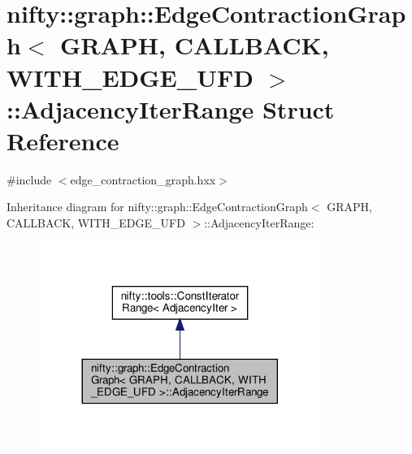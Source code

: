 \hypertarget{structnifty_1_1graph_1_1EdgeContractionGraph_1_1AdjacencyIterRange}{}\section{nifty\+:\+:graph\+:\+:Edge\+Contraction\+Graph$<$ G\+R\+A\+PH, C\+A\+L\+L\+B\+A\+CK, W\+I\+T\+H\+\_\+\+E\+D\+G\+E\+\_\+\+U\+FD $>$\+:\+:Adjacency\+Iter\+Range Struct Reference}
\label{structnifty_1_1graph_1_1EdgeContractionGraph_1_1AdjacencyIterRange}


{\ttfamily \#include $<$edge\+\_\+contraction\+\_\+graph.\+hxx$>$}



Inheritance diagram for nifty\+:\+:graph\+:\+:Edge\+Contraction\+Graph$<$ G\+R\+A\+PH, C\+A\+L\+L\+B\+A\+CK, W\+I\+T\+H\+\_\+\+E\+D\+G\+E\+\_\+\+U\+FD $>$\+:\+:Adjacency\+Iter\+Range\+:
\nopagebreak
\begin{figure}[H]
\begin{center}
\leavevmode
\includegraphics[width=260pt]{structnifty_1_1graph_1_1EdgeContractionGraph_1_1AdjacencyIterRange__inherit__graph}
\end{center}
\end{figure}


